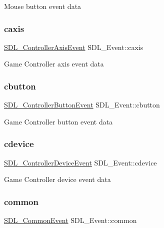 Mouse button event data \mbox{\label{union_s_d_l___event_aa8f6df0f2716fae56204b12ab4a4c289}} 
\subsubsection{\texorpdfstring{caxis}{caxis}}
{\footnotesize\ttfamily \hyperlink{struct_s_d_l___controller_axis_event}{S\+D\+L\+\_\+\+Controller\+Axis\+Event} S\+D\+L\+\_\+\+Event\+::caxis}

Game Controller axis event data \mbox{\label{union_s_d_l___event_aee2b5671c8dcdb447023715cc21593cb}} 
\subsubsection{\texorpdfstring{cbutton}{cbutton}}
{\footnotesize\ttfamily \hyperlink{struct_s_d_l___controller_button_event}{S\+D\+L\+\_\+\+Controller\+Button\+Event} S\+D\+L\+\_\+\+Event\+::cbutton}

Game Controller button event data \mbox{\label{union_s_d_l___event_ad3beed01e690b885728e0b0e1d636378}} 
\subsubsection{\texorpdfstring{cdevice}{cdevice}}
{\footnotesize\ttfamily \hyperlink{struct_s_d_l___controller_device_event}{S\+D\+L\+\_\+\+Controller\+Device\+Event} S\+D\+L\+\_\+\+Event\+::cdevice}

Game Controller device event data \mbox{\label{union_s_d_l___event_abe5cb8767f93de55163c8ddd4562a7f2}} 
\subsubsection{\texorpdfstring{common}{common}}
{\footnotesize\ttfamily \hyperlink{struct_s_d_l___common_event}{S\+D\+L\+\_\+\+Common\+Event} S\+D\+L\+\_\+\+Event\+::common}

